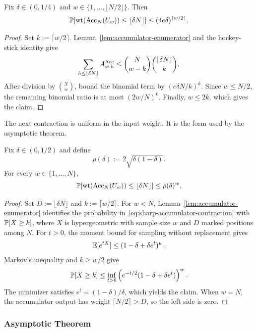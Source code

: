 \begin{lemma}
\label{lem:accumulator-tail}
\leavevmode\par
Fix $\delta\in(0,1/4)$ and
$w\in\{1,\ldots,\lfloor N/2\rfloor\}$. Then
\[
  \mathbb P[\operatorname{wt}(\operatorname{Acc}_N(U_w))\le\lfloor\delta N\rfloor]
  \le
  (4e\delta)^{\lceil w/2\rceil}.
\]
\end{lemma}

\begin{proof}
Set $k:=\lceil w/2\rceil$. Lemma~\ref{lem:accumulator-enumerator} and the
hockey-stick identity give
\[
  \sum_{h\le\lfloor\delta N\rfloor}A^{\operatorname{Acc}}_{w,h}
  \le
  \binom{N}{w-k}\binom{\lfloor\delta N\rfloor}{k}.
\]
After division by $\binom Nw$, bound the binomial term by
$(e\delta N/k)^k$. Since $w\le N/2$, the remaining binomial ratio is at
most $(2w/N)^k$. Finally, $w\le2k$, which gives the claim.
\end{proof}

The next contraction is uniform in the input weight. It is the form used by
the asymptotic theorem.

\begin{lemma}
\label{lem:sharp-accumulator-contraction}
Fix $\delta\in(0,1/2)$ and define
\[
  \rho(\delta):=2\sqrt{\delta(1-\delta)}.
\]
For every $w\in\{1,\ldots,N\}$,
\begin{equation}
  \mathbb P[\operatorname{wt}(\operatorname{Acc}_N(U_w))\le\lfloor\delta N\rfloor]
  \le \rho(\delta)^w.
  \label{eq:sharp-accumulator-contraction}
\end{equation}
\end{lemma}

\begin{proof}
Set $D:=\lfloor\delta N\rfloor$ and $k:=\lceil w/2\rceil$.
For $w<N$, Lemma~\ref{lem:accumulator-enumerator} identifies the probability
in~\eqref{eq:sharp-accumulator-contraction} with $\mathbb P[X\ge k]$, where $X$
is hypergeometric with sample size $w$ and $D$ marked positions among $N$.
For $t>0$, the moment bound for sampling without replacement gives
\[
  \mathbb E[e^{tX}]
  \le (1-\delta+\delta e^t)^w.
\]
Markov's inequality and $k\ge w/2$ give
\[
  \mathbb P[X\ge k]
  \le
  \inf_{t>0}
  \left(e^{-t/2}(1-\delta+\delta e^t)\right)^w.
\]
The minimizer satisfies $e^t=(1-\delta)/\delta$, which yields the claim.
When $w=N$, the accumulator output has weight $\lceil N/2\rceil>D$, so the
left side is zero.
\end{proof}

\subsubsection{Asymptotic Theorem}
\label{sec:accumulator-spin-theorem}

